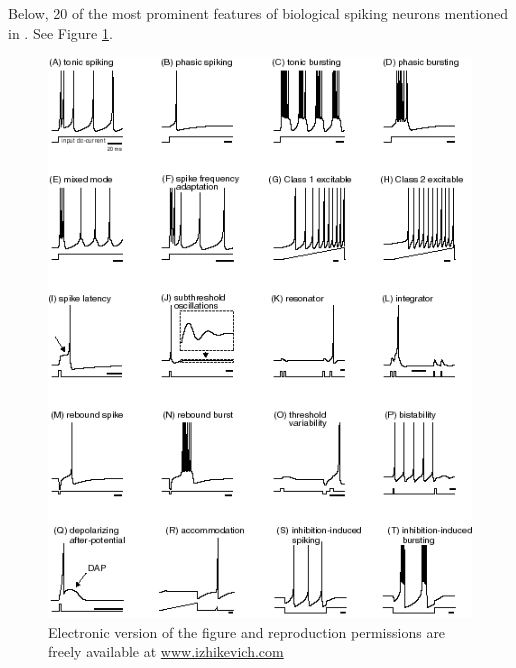 \documentclass{article} %
\begin{document}
Below, 20 of the most prominent features of biological spiking neurons mentioned in \cite{Izhikevich2004Which}. See Figure \ref{fig:features}.

\begin{figure}[ht]
    \centering
    \includegraphics[width=\linewidth]{features.png}
    \caption{Electronic version of the figure and reproduction permissions are freely available at \url{www.izhikevich.com}}
    \label{fig:features}
\end{figure}
\end{document}

